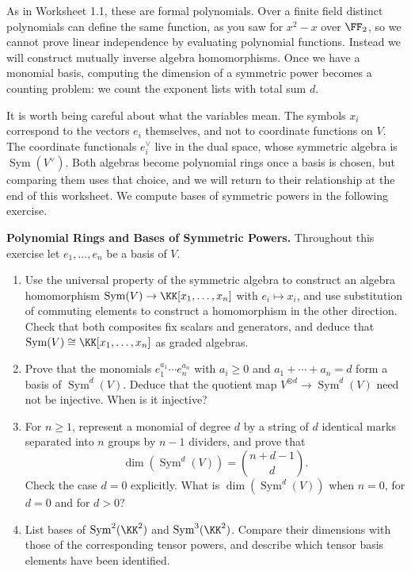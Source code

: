 \documentclass[12pt,reqno]{amsart}
\DeclareMathOperator{\Sym}{Sym}
\begin{document}
As in Worksheet 1.1, these are formal polynomials. Over a finite field distinct polynomials can define the same function, as you saw for $x^2-x$ over $\FF_2$, so we cannot prove linear independence by evaluating polynomial functions. Instead we will construct mutually inverse algebra homomorphisms. Once we have a monomial basis, computing the dimension of a symmetric power becomes a counting problem: we count the exponent lists with total sum $d$.

It is worth being careful about what the variables mean. The symbols $x_i$ correspond to the vectors $e_i$ themselves, and not to coordinate functions on $V$. The coordinate functionals $e_i^{\vee}$ live in the dual space, whose symmetric algebra is $\Sym(V^{\vee})$. Both algebras become polynomial rings once a basis is chosen, but comparing them uses that choice, and we will return to their relationship at the end of this worksheet. We compute bases of symmetric powers in the following exercise.

\hrulefill

\begin{problems}
\item\label{s:polynomial} \textbf{Polynomial Rings and Bases of Symmetric Powers.} Throughout this exercise let $e_1,\ldots,e_n$ be a basis of $V$.
\begin{enumerate}
\item Use the universal property of the symmetric algebra to construct an algebra homomorphism $\Sym(V)\to\KK[x_1,\ldots,x_n]$ with $e_i\mapsto x_i$, and use substitution of commuting elements to construct a homomorphism in the other direction. Check that both composites fix scalars and generators, and deduce that $\Sym(V)\cong\KK[x_1,\ldots,x_n]$ as graded algebras.
\item Prove that the monomials $e_1^{a_1}\cdots e_n^{a_n}$ with $a_i\geq0$ and $a_1+\cdots+a_n=d$ form a basis of $\Sym^d(V)$. Deduce that the quotient map $V^{\otimes d}\to\Sym^d(V)$ need not be injective. When is it injective?
\item For $n\geq1$, represent a monomial of degree $d$ by a string of $d$ identical marks separated into $n$ groups by $n-1$ dividers, and prove that
\[
\dim(\Sym^d(V))=\binom{n+d-1}{d}.
\]
Check the case $d=0$ explicitly. What is $\dim(\Sym^d(V))$ when $n=0$, for $d=0$ and for $d>0$?
\item List bases of $\Sym^2(\KK^2)$ and $\Sym^3(\KK^2)$. Compare their dimensions with those of the corresponding tensor powers, and describe which tensor basis elements have been identified.
\end{enumerate}
\end{problems}
\end{document}
